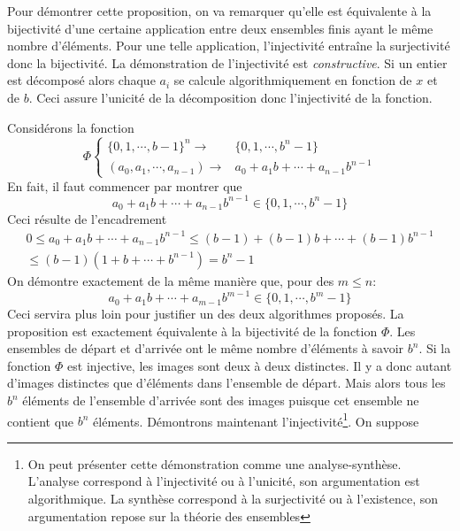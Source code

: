 \begin{demo}
 Pour démontrer cette proposition, on va remarquer qu'elle est équivalente à la bijectivité d'une certaine application entre deux ensembles finis ayant le même nombre d'éléments. Pour une telle application, l'injectivité entraîne la surjectivité donc la bijectivité.\newline
La démonstration de l'injectivité est \emph{constructive}. Si un entier est décomposé alors chaque $a_i$ se calcule algorithmiquement en fonction de $x$ et de $b$. Ceci assure l'unicité de la décomposition donc l'injectivité de la fonction.

Considérons la fonction
\begin{displaymath}
 \Phi\left\lbrace 
\begin{aligned}
\{0,1,\cdots,b-1\}^n \rightarrow& \{0,1,\cdots,b^n-1\}\\
(a_0,a_1,\cdots,a_{n-1}) \rightarrow& a_0 + a_1 b +\cdots +a_{n-1}b^{n-1} 
\end{aligned}
\right.
\end{displaymath}
En fait, il faut commencer par montrer que
\begin{displaymath}
 a_0 + a_1 b +\cdots +a_{n-1}b^{n-1}\in \{0,1,\cdots,b^n-1\}
\end{displaymath}
Ceci résulte de l'encadrement
\begin{multline*}
 0\leq a_0 + a_1 b +\cdots +a_{n-1}b^{n-1} 
\leq (b-1) + (b-1) b +\cdots +(b-1)b^{n-1}\\
\leq (b-1)(1+b+\cdots +b^{n-1})=b^n-1
\end{multline*}
On démontre exactement de la même manière que, pour des $m\leq n$:
\begin{displaymath}
 a_0 + a_1 b +\cdots +a_{m-1}b^{m-1}\in \{0,1,\cdots,b^m-1\}
\end{displaymath}
Ceci servira plus loin pour justifier un des deux algorithmes proposés.\newline
La proposition est exactement équivalente à la bijectivité de la fonction $\Phi$. Les ensembles de départ et d'arrivée ont le même nombre d'éléments à savoir $b^n$.\newline
Si la fonction $\Phi$ est injective, les images sont deux à deux distinctes. Il y a donc autant d'images distinctes que d'éléments dans l'ensemble de départ. Mais alors tous les $b^n$ éléments de l'ensemble d'arrivée sont des images puisque cet ensemble ne contient que $b^n$ éléments.\newline
Démontrons maintenant l'injectivité\footnote{On peut présenter cette démonstration comme une analyse-synthèse. L'analyse correspond à l'injectivité ou à l'unicité, son argumentation est algorithmique. La synthèse correspond à la surjectivité ou à l'existence, son argumentation repose sur la théorie des ensembles}. On suppose

\end{demo}

